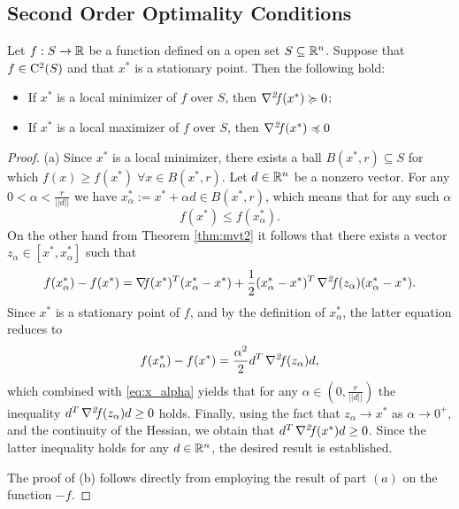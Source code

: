 \documentclass[10pt,a4paper]{article}
\begin{document}
\subsection{Second Order Optimality Conditions}
\begin{theorem}\label{thm:second_order_optimality}
	Let $f:S\to \mathbb{R}$ be a function defined on a open set $S\subseteq \mathbb{R}^n$. Suppose that $f\in\mathord{\mathrm{C^2}}(S)$ and that $x^*$ is a stationary point. Then the following hold:
\begin{itemize}
	\item[(a)] If $x^*$ is a local minimizer of $f$ over $S$, then $\operatorname*{\mathit{\nabla^2 \!f}} (x^*)\succcurlyeq 0$;
	\item[(b)] If $x^*$ is a local maximizer of $f$ over $S$, then $\operatorname*{\mathit{\nabla^2 \!f}} (x^*)\preccurlyeq 0$ 	
\end{itemize}
\end{theorem}
\begin{proof}
	(a) Since $x^*$ is a local minimizer, there exists a ball $B(x^*,r)\subseteq S$ for which $f(x) \geq f(x^*)\; \forall x\in B(x^*,r)$. Let $d\in \mathbb{R}^n$ be a nonzero vector. For any $0<\alpha<\frac{r}{||d||}$ we have $x_\alpha^* :=x^* + \alpha d \in B(x^*, r)$, which means that for any such $\alpha$
	\begin{equation}\label{eq:x_alpha}
		f(x^*)\leq f(x_\alpha^*).
	\end{equation}
On the other hand from Theorem \ref{thm:mvt2} it follows that there exists a vector $z_\alpha \in [x^*,x_\alpha^*]$ such that 
\begin{equation*}
	f(x_\alpha^*)- f(x^*) =\operatorname*{\mathit{\nabla \!f}} (x^*)^T(x_\alpha^*-x^*) +\frac{1}{2}(x_\alpha^*-x^*)^T\operatorname*{\mathit{\nabla^2 \!f}}(z_\alpha)(x_\alpha^*-x^*).
\end{equation*}
Since $x^*$ is a stationary point of $f$, and by the definition of $x_\alpha^*$, the latter equation reduces to 
\begin{equation*}
	f(x_\alpha^*)- f(x^*) = \frac{\alpha^2}{2} d^T\operatorname*{\mathit{\nabla^2 \!f}}(z_\alpha) d,
\end{equation*}
which combined with \eqref{eq:x_alpha} yields that for any $\alpha \in (0, \frac{r}{||d||})$ the inequality $d^T \operatorname*{\mathit{\nabla^2 \!f}}(z_\alpha) d\geq 0$ holds. Finally, using the fact that $z_\alpha \to x^*$ as $\alpha\to 0^+$, and the continuity of the Hessian, we obtain that $d^T \operatorname*{\mathit{\nabla^2 \!f}}(x^*) d\geq 0$. Since the latter inequality holds for any $d \in\mathbb{R}^n$, the desired result is established. 
\par The proof of (b) follows directly from employing the result of part $(a)$ on the function $-f$.
\end{proof}
\end{document}
